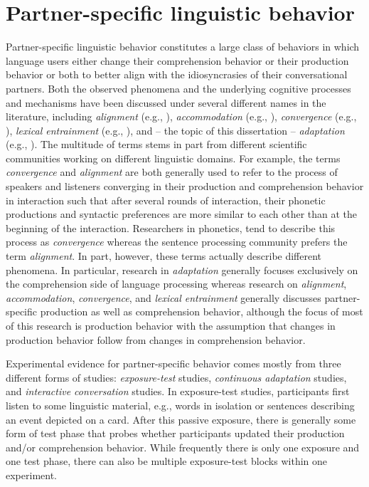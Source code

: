 



\section{Partner-specific linguistic behavior}

Partner-specific linguistic behavior constitutes a large class of behaviors in which language users either change their comprehension behavior or their production behavior or both to better align with the idiosyncrasies of their conversational partners. Both the observed phenomena and the underlying cognitive processes and mechanisms have been discussed under several different names in the literature, including \textit{alignment} (e.g., \cite{PickeringGarrod2004}), \textit{accommodation} (e.g., \cite{Goldinger1998}), \textit{convergence} (e.g., \cite{Pardo2006}), \textit{lexical entrainment} (e.g., \cite{ClarkWilkesGibbs1986}), and -- the topic of this dissertation -- \textit{adaptation} (e.g., \cite{KleinschmidtJaeger2015}). The multitude of terms stems in part from different scientific communities working on different linguistic domains. For example, the terms \textit{convergence} and \textit{alignment} 
are both generally used to refer to the process of speakers and listeners converging in their production and comprehension behavior in interaction such that after several rounds of interaction, 
their phonetic productions and syntactic preferences are more similar to each other than at the beginning of the interaction. Researchers in phonetics, tend to describe this process as \textit{convergence} 
whereas the sentence processing community prefers the term \textit{alignment}. In part, however, these terms actually describe different phenomena. In particular, research in \textit{adaptation} generally focuses exclusively
on the comprehension side of language processing whereas research on \textit{alignment}, \textit{accommodation}, \textit{convergence}, and \textit{lexical entrainment} generally discusses partner-specific production as well as comprehension behavior, although the focus of most of this research is production behavior with the assumption that changes in production behavior follow from changes in comprehension behavior.

Experimental evidence for partner-specific behavior comes mostly from three different forms of studies: \textit{exposure-test} studies, \textit{continuous adaptation} studies, and \textit{interactive conversation} studies.
In exposure-test studies, participants first listen to some linguistic material,  e.g., words in isolation or sentences describing an event depicted on a card.  After this passive exposure, there is generally
some form of test phase that probes whether participants updated their production and/or comprehension behavior. While frequently there is only one exposure and one test phase, there can also be multiple
exposure-test blocks within one experiment.

